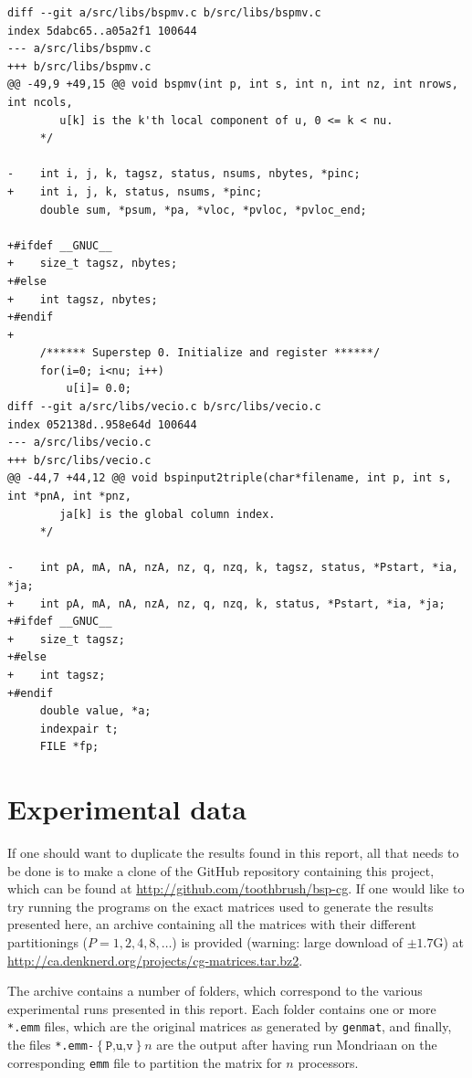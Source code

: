 \documentclass[a4paper]{article}
\begin{document}
\begin{verbatim}
diff --git a/src/libs/bspmv.c b/src/libs/bspmv.c
index 5dabc65..a05a2f1 100644
--- a/src/libs/bspmv.c
+++ b/src/libs/bspmv.c
@@ -49,9 +49,15 @@ void bspmv(int p, int s, int n, int nz, int nrows, int ncols,
        u[k] is the k'th local component of u, 0 <= k < nu.
     */
 
-    int i, j, k, tagsz, status, nsums, nbytes, *pinc;
+    int i, j, k, status, nsums, *pinc;
     double sum, *psum, *pa, *vloc, *pvloc, *pvloc_end;
 
+#ifdef __GNUC__
+    size_t tagsz, nbytes;
+#else
+    int tagsz, nbytes;
+#endif
+
     /****** Superstep 0. Initialize and register ******/
     for(i=0; i<nu; i++)
         u[i]= 0.0;
diff --git a/src/libs/vecio.c b/src/libs/vecio.c
index 052138d..958e64d 100644
--- a/src/libs/vecio.c
+++ b/src/libs/vecio.c
@@ -44,7 +44,12 @@ void bspinput2triple(char*filename, int p, int s, int *pnA, int *pnz,
        ja[k] is the global column index.
     */
 
-    int pA, mA, nA, nzA, nz, q, nzq, k, tagsz, status, *Pstart, *ia, *ja;
+    int pA, mA, nA, nzA, nz, q, nzq, k, status, *Pstart, *ia, *ja;
+#ifdef __GNUC__
+    size_t tagsz;
+#else
+    int tagsz;
+#endif
     double value, *a;
     indexpair t;
     FILE *fp;
\end{verbatim}
\clearpage

\section{Experimental data}

If one should want to duplicate the results found in this report, all that needs to be done
is to make a clone of the GitHub repository containing this project, which can be found at
\url{http://github.com/toothbrush/bsp-cg}. If one would like to try running the programs on the exact matrices
used to generate the results presented here, an archive containing all the matrices with their
different partitionings ($P=1,2,4,8, \ldots$) is provided (warning: large
download of $\pm 1.7$G) at \url{http://ca.denknerd.org/projects/cg-matrices.tar.bz2}.

The archive contains a number of folders, which correspond to the various experimental runs
presented in this report. Each folder contains one or more \texttt{*.emm} files, which are the original
matrices as generated by \texttt{genmat}, and finally, the files \texttt{*.emm-$\left\{\texttt{P,u,v}\right\}n$} are
the output after having run Mondriaan on the corresponding \texttt{emm} file to partition the matrix for $n$ processors.
\end{document}
